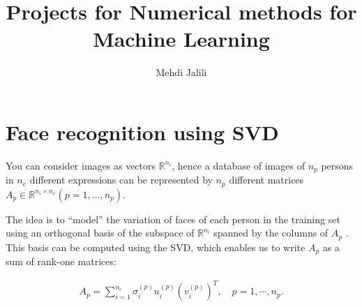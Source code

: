 \documentclass{article}
\title{Projects for Numerical methods for Machine Learning}
\author{Mehdi Jalili}
\begin{document}
\maketitle

\section{Face recognition using SVD}
You can consider images as vectors $ \mathbb{R}^{n_i} $, hence a database of images of $ n_p $ persons in $ n_e $ different expressions can be represented by $ n_p $ different matrices $ A_p \in \mathbb{R}^{n_i \times n_e} (p=1,\ldots, n_p)$.


The idea is to “model” the variation of faces of each person in the
training set using an orthogonal basis of the subspace of $ \mathbb{R}^{n_i} $ spanned by the columns of
$ A_p $ . This basis can be computed using the SVD, which enables us to write $ A_p $ as a sum
of rank-one matrices:

\begin{align}
	A_p = \sum\limits_{i=1}^{n_e} \sigma_i^{(p)} u_i^{(p)}(v_i^{(p)})^T,\quad p = 1,\cdots,n_p.
\end{align}
\end{document}
